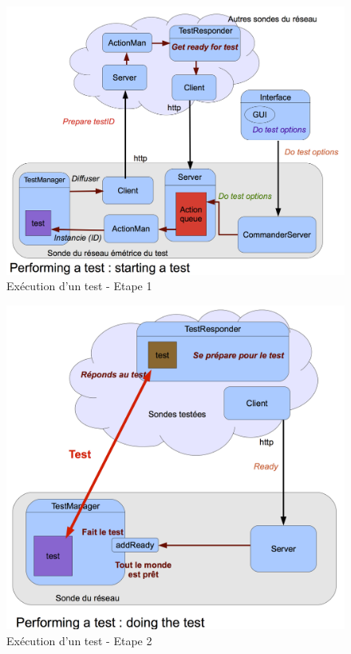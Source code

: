 \documentclass[a4paper,11pt]{article}
\begin{document}
\begin{figure}[!ht]
\centering\includegraphics[width=\linewidth]{img/graphTest1.png}
\caption{Exécution d'un test - Etape 1}
\end{figure}

\begin{figure}[!ht]
\centering\includegraphics[width=\linewidth]{img/graphTest2.png}
\caption{Exécution d'un test - Etape 2}
\end{figure}
\end{document}
